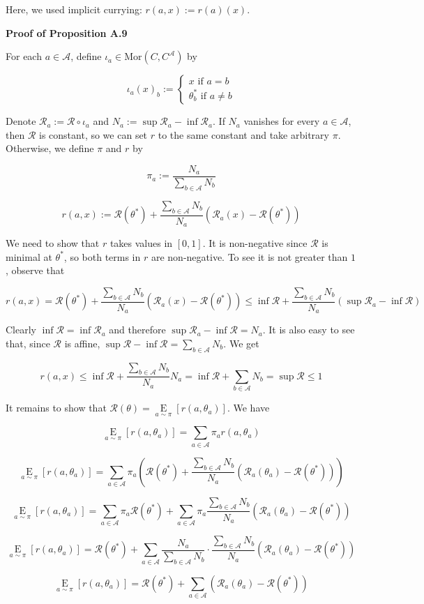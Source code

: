 \documentclass[a4paper]{article}
\newcommand{\Co}[1]{}
\newcommand{\AP}[1]{\left(#1\right)}
\newcommand{\AB}[1]{\left[#1\right]}
\newcommand{\Ea}[2]{\underset{#1}{\operatorname{E}}\AB{#2}}
\newcommand{\Mor}{\mathrm{Mor}}
\newcommand{\A}{\mathcal{A}}
\newcommand{\R}{\mathcal{R}}
\begin{document}
Here, we used implicit currying: $r(a,x):=r(a)(x)$.

\textbf{Proof of Proposition A.9}\Co{b}

For each $a\in\A$, define $\iota_a\in\Mor\AP{C,C^\A}$ by

$$\iota_a(x)_b:=\begin{cases} x \text{ if } a=b \\ \theta^*_b \text{ if } a\ne b\end{cases}$$

Denote $\R_a:=\R\circ\iota_a$ and $N_a:=\sup\R_a-\inf\R_a$. If $N_a$ vanishes for every $a\in\A$, then $\R$ is constant, so we can set $r$ to the same constant and take arbitrary $\pi$. Otherwise, we define $\pi$ and $r$ by

$$\pi_a:=\frac{N_a}{\sum_{b\in\A}N_b}$$

$$r(a,x):=\R\AP{\theta^*} +\frac{\sum_{b\in\A}N_b}{N_a}\AP{\R_a(x)-\R\AP{\theta^*}}$$

We need to show that $r$ takes values in $[0,1]$. It is non-negative since $\R$ is minimal at $\theta^*$, so both terms in $r$ are non-negative. To see it is not greater than $1$, observe that

$$r(a,x)=\R\AP{\theta^*} +\frac{\sum_{b\in\A}N_b}{N_a}\AP{\R_a(x)-\R\AP{\theta^*}}\leq\inf\R +\frac{\sum_{b\in\A}N_b}{N_a}\AP{\sup\R_a-\inf\R}$$

Clearly $\inf\R=\inf\R_a$ and therefore $\sup\R_a-\inf\R=N_a$. It is also easy to see that, since $\R$ is affine, $\sup\R-\inf\R=\sum_{b\in\A}N_b$. We get

$$r(a,x)\leq\inf\R+\frac{\sum_{b\in\A}N_b}{N_a}N_a=\inf\R+\sum_{b\in\A}N_b=\sup\R\leq 1$$

It remains to show that $\R(\theta)=\Ea{a\sim\pi}{r\AP{a,\theta_a}}$. We have

$$\Ea{a\sim\pi}{r\AP{a,\theta_a}}=\sum_{a\in\A}\pi_ar\AP{a,\theta_a}$$

$$\Ea{a\sim\pi}{r\AP{a,\theta_a}}=\sum_{a\in\A}\pi_a\AP{\R\AP{\theta^*} +\frac{\sum_{b\in\A}N_b}{N_a}\AP{\R_a\AP{\theta_a}-\R\AP{\theta^*}}}$$

$$\Ea{a\sim\pi}{r\AP{a,\theta_a}}=\sum_{a\in\A}\pi_a\R\AP{\theta^*} +\sum_{a\in\A}\pi_a{\frac{\sum_{b\in\A}N_b}{N_a}\AP{\R_a\AP{\theta_a}-\R\AP{\theta^*}}}$$

$$\Ea{a\sim\pi}{r\AP{a,\theta_a}}=\R\AP{\theta^*} +\sum_{a\in\A}\frac{N_a}{\sum_{b\in\A}N_b}\cdot{\frac{\sum_{b\in\A}N_b}{N_a}\AP{\R_a\AP{\theta_a}-\R\AP{\theta^*}}}$$

$$\Ea{a\sim\pi}{r\AP{a,\theta_a}}=\R\AP{\theta^*} +\sum_{a\in\A}\AP{\R_a\AP{\theta_a}-\R\AP{\theta^*}}$$
\end{document}
